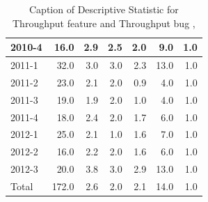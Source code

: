 \documentclass[UKenglish]{ifimaster}  %
\begin{document}
\begin{appendices}
\begin{table}[!htbp]
\begin{adjustwidth}{-2.5cm}{}
{{\begin{tabular}{ | l | r | r | r | r | r | r | }
2010-4 & 16.0 & 2.9 & 2.5 & 2.0 & 9.0 & 1.0\\ \hline
2011-1 & 32.0 & 3.0 & 3.0 & 2.3 & 13.0 & 1.0\\ \hline
2011-2 & 23.0 & 2.1 & 2.0 & 0.9 & 4.0 & 1.0\\ \hline
2011-3 & 19.0 & 1.9 & 2.0 & 1.0 & 4.0 & 1.0\\ \hline
2011-4 & 18.0 & 2.4 & 2.0 & 1.7 & 6.0 & 1.0\\ \hline
2012-1 & 25.0 & 2.1 & 1.0 & 1.6 & 7.0 & 1.0\\ \hline
2012-2 & 16.0 & 2.2 & 2.0 & 1.6 & 6.0 & 1.0\\ \hline
2012-3 & 20.0 & 3.8 & 3.0 & 2.9 & 13.0 & 1.0\\ \hline
Total & 172.0 & 2.6 & 2.0 & 2.1 & 14.0 & 1.0\\ \hline
\end{tabular}
}
}
\end{adjustwidth}
\caption[Optional caption for list of figures]{Caption of Descriptive Statistic for Throughput feature and Throughput bug  , }
\label{DS:7:2}
\end{table}



\begin{table}[!htbp]
  \begin{adjustwidth}{-1.5cm}{}
\end{adjustwidth}
\end{table}
\end{appendices}
\end{document}
